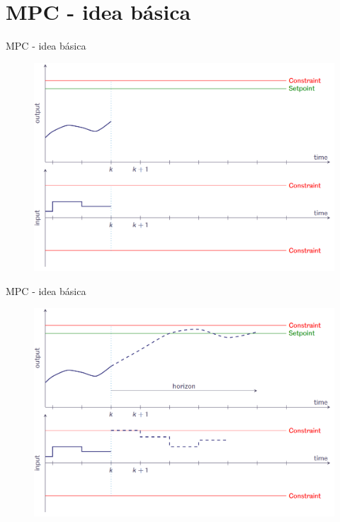 \documentclass[8pt]{beamer}
\begin{document}
\section{MPC - idea básica}
\begin{frame}[fragile]{MPC - idea básica}
	\begin{figure}[!ht]
		\centering
		\includegraphics[width=1\linewidth]{figures/MPC_basic_1}	
	\end{figure}
\end{frame}
\begin{frame}[fragile]{MPC - idea básica}
	\begin{figure}[!ht]
		\centering
		\includegraphics[width=1\linewidth]{figures/MPC_basic_2}	
	\end{figure}
\end{frame}
\end{document}
